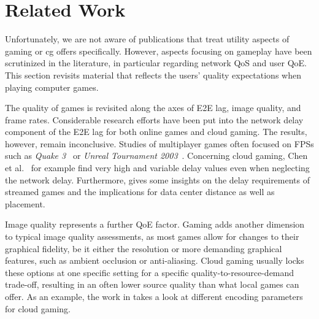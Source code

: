 \section{Related Work}
\label{sec:relatedwork}

Unfortunately, we are not aware of publications that treat utility
aspects of gaming or \gls{cg} offers specifically. However, aspects focusing
on gameplay have been scrutinized in the literature, in particular
regarding network \gls{QoS} and user \gls{QoE}.
This section revisits material that reflects the users'
quality expectations when playing computer games.


The quality of games is revisited along the axes of \gls{E2E} lag, image quality, and frame rates.
Considerable research efforts have been put into the network delay component of the \gls{E2E} lag for both online games and cloud gaming. The results, however, remain inconclusive. Studies of multiplayer games often focused on \glspl{FPS} such as \textit{Quake 3}~\cite{1266180} or \textit{Unreal Tournament 2003}~\cite{Beigbeder:2004:ELL:1016540.1016556}. Concerning cloud gaming, Chen et al.~\cite{6670099} for example find very high and variable delay values even when neglecting the network delay. Furthermore, \cite{Choy:2012:BSC:2501560.2501563} gives some insights on the delay requirements of streamed games and the implications for data center distance as well as placement.

Image quality represents a further \gls{QoE} factor. Gaming adds another dimension to typical image quality assessments, as most games allow for changes to their graphical fidelity, be it either the resolution or more demanding graphical features, such as ambient occlusion or anti-aliasing. Cloud gaming usually locks these options at one specific setting for a specific quality-to-resource-demand trade-off, resulting in an often lower source quality than what local games can offer. As an example, the work in \cite{slivarimpact} takes a look at different encoding parameters for cloud gaming.%


